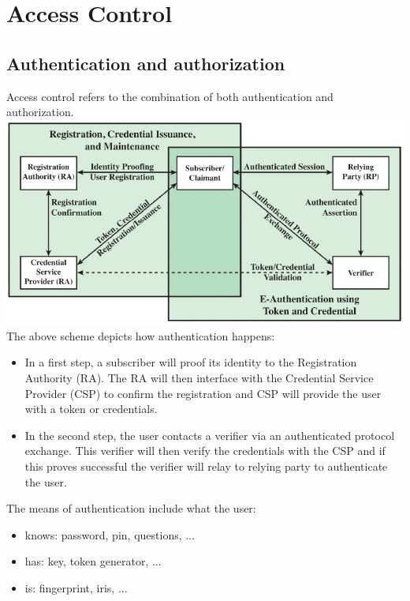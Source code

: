 \documentclass[12pt]{article}
\begin{document}
 \newpage
 \section{Access Control}
 \subsection{Authentication and authorization}
 Access control refers to the combination of both authentication and authorization. \\
 \noindent{}
\includegraphics[width=\linewidth]{./slides/L6P1AUTHMOD.PNG}\\
The above scheme depicts how authentication happens:
\begin{itemize}
	\item In a first step, a subscriber will proof its identity to the Registration Authority (RA). The RA will then interface with the Credential Service Provider (CSP) to confirm the registration and CSP will provide the user with a token or credentials.
	\item In the second step, the user contacts a verifier via an authenticated protocol exchange. This verifier will then verify the credentials with the CSP and if this proves successful the verifier will relay to relying party to authenticate the user.
\end{itemize}
The means of authentication include  what the user:
\begin{itemize}
	\item knows: password, pin, questions, ...
	\item has: key, token generator, ...
	\item is: fingerprint, iris, ...
\end{itemize}
\end{document}
